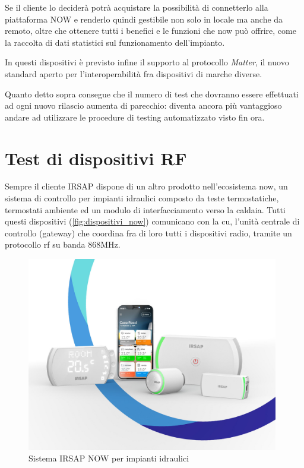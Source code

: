 \documentclass[12pt,a4paper,twoside,titlepage]{book}
\begin{document}
Se il cliente lo deciderà potrà acquistare la possibilità di connetterlo alla piattaforma
NOW e renderlo quindi gestibile non solo in locale ma anche da remoto, oltre che
ottenere tutti i benefici e le funzioni che \Gls{now} può offrire, come la
raccolta di dati statistici sul funzionamento dell'impianto.

In questi dispositivi è previsto infine il supporto al protocollo \textit{Matter},
il nuovo standard aperto per l'interoperabilità fra dispositivi di marche diverse.

Quanto detto sopra consegue che il numero di test che dovranno essere effettuati ad
ogni nuovo rilascio aumenta di parecchio: diventa ancora più vantaggioso andare ad
utilizzare le procedure di testing automatizzato visto fin ora.

\section{Test di dispositivi RF}

Sempre il cliente IRSAP dispone di un altro prodotto nell'ecosistema \Gls{now},
un sistema di controllo per impianti idraulici composto da teste termostatiche,
termostati ambiente ed un modulo di interfacciamento verso la caldaia. Tutti questi
dispositivi (\autoref{fig:dispositivi_now}) comunicano con la \acrfull{cu}, l'unità 
centrale di controllo (\gls{gateway}) che coordina fra di loro tutti i dispositivi radio, 
tramite un protocollo \acrshort{rf} su banda 868MHz.

\begin{figure}[h]
    \centering
    \includegraphics[width=11cm]{img/now.jpeg}
    \caption{Sistema IRSAP NOW per impianti idraulici}
    \label{fig:dispositivi_now}
\end{figure}
\end{document}
